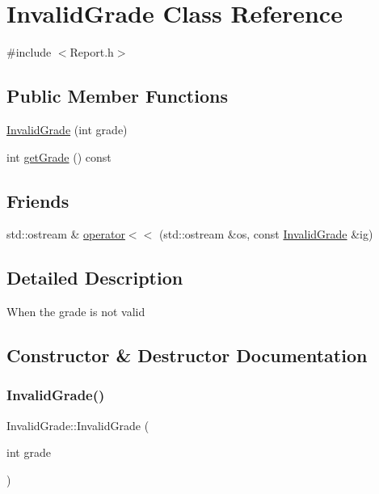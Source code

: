 \hypertarget{class_invalid_grade}{}\section{Invalid\+Grade Class Reference}
\label{class_invalid_grade}


{\ttfamily \#include $<$Report.\+h$>$}

\subsection*{Public Member Functions}
\begin{DoxyCompactItemize}
\item 
\mbox{\hyperlink{class_invalid_grade_a45b993c52fbd0083f8344a4e437b0fd8}{Invalid\+Grade}} (int grade)
\item 
int \mbox{\hyperlink{class_invalid_grade_a804b310f3aa6d5b388ff36dac76b06da}{get\+Grade}} () const
\end{DoxyCompactItemize}
\subsection*{Friends}
\begin{DoxyCompactItemize}
\item 
std\+::ostream \& \mbox{\hyperlink{class_invalid_grade_abd6d4b28be315c2b68592594412c7632}{operator$<$$<$}} (std\+::ostream \&os, const \mbox{\hyperlink{class_invalid_grade}{Invalid\+Grade}} \&ig)
\end{DoxyCompactItemize}


\subsection{Detailed Description}
When the grade is not valid 

\subsection{Constructor \& Destructor Documentation}
\mbox{\label{class_invalid_grade_a45b993c52fbd0083f8344a4e437b0fd8}} 
\subsubsection{\texorpdfstring{Invalid\+Grade()}{InvalidGrade()}}
{\footnotesize\ttfamily Invalid\+Grade\+::\+Invalid\+Grade (\begin{DoxyParamCaption}\item[{int}]{grade }\end{DoxyParamCaption})\hspace{0.3cm}{\ttfamily [inline]}}



